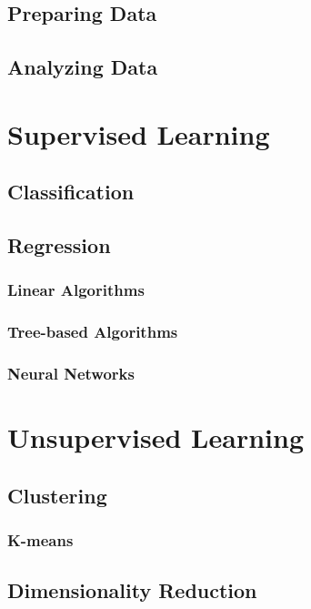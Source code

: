 \subsection{Preparing Data}

\subsection{Analyzing Data}

\section{Supervised Learning}

\subsection{Classification}

\subsection{Regression}

\subsubsection{Linear Algorithms}

\subsubsection{Tree-based Algorithms}

\subsubsection{Neural Networks}

\section{Unsupervised Learning}

\subsection{Clustering}

\subsubsection{K-means}

\subsection{Dimensionality Reduction}

